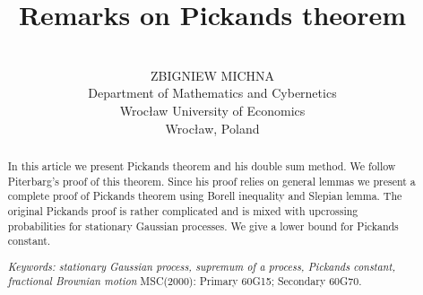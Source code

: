\newtheorem{theorem}{Theorem}
\newtheorem{lemma}{Lemma}
\newtheorem{proposition}{Proposition}
\newtheorem{definition}{Definition}
\newtheorem{corollary}{Corollary}
\newtheorem{assumption}{Assumption}
\newtheorem{remark}{Remark}
\newtheorem{example}{Example}
\renewcommand{\baselinestretch}{1.1}
\renewcommand{\abstractname}{\bf Abstract}
\renewcommand{\floatpagefraction}{1}

\mathsurround=2pt

\title{\bf Remarks on Pickands theorem}
\author{
\\
ZBIGNIEW MICHNA\\
Department of Mathematics and Cybernetics\\
Wroc{\l}aw University of Economics\\
Wroc{\l}aw, Poland}
\date{}








\maketitle

\begin{abstract}
In this article we present Pickands theorem and his double sum method. We follow Piterbarg's
proof of this theorem. 
Since his proof relies on general lemmas we present a complete proof of Pickands
theorem using Borell inequality and Slepian lemma.
The original Pickands proof is rather complicated
and is mixed with upcrossing probabilities for stationary Gaussian processes. We give a lower bound for 
Pickands constant.

\vspace{5mm}
{\it Keywords: stationary Gaussian process, supremum of a process, Pickands constant, fractional Brownian motion}
\newline
\vspace{2cm}
MSC(2000): Primary 60G15; Secondary 60G70.
\end{abstract}

